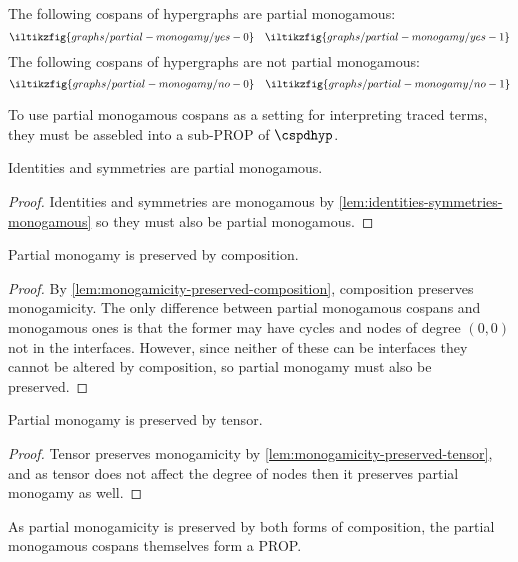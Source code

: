 \begin{example}\label{ex:partial-monogamous}
    The following cospans of hypergraphs are partial monogamous:
    \[
        \iltikzfig{graphs/partial-monogamy/yes-0}
        \quad
        \iltikzfig{graphs/partial-monogamy/yes-1}
    \]
    The following cospans of hypergraphs are not partial monogamous:
    \[
        \iltikzfig{graphs/partial-monogamy/no-0}
        \quad
        \iltikzfig{graphs/partial-monogamy/no-1}
    \]
\end{example}

To use partial monogamous cospans as a setting for interpreting traced terms,
they must be assebled into a sub-PROP of \(\cspdhyp\).

\begin{lemma}\label{lem:identities-symmetries-partial-monogamous}
    Identities and symmetries are partial monogamous.
\end{lemma}
\begin{proof}
    Identities and symmetries are monogamous by
    \cref{lem:identities-symmetries-monogamous} so they must also be partial
    monogamous.
\end{proof}

\begin{lemma}\label{lem:partial-monogamicity-preserved-composition}
    Partial monogamy is preserved by composition.
\end{lemma}
\begin{proof}
    By \cref{lem:monogamicity-preserved-composition}, composition preserves
    monogamicity.
    The only difference between partial monogamous cospans and monogamous ones
    is that the former may have cycles and nodes of degree \((0,0)\) not in the
    interfaces.
    However, since neither of these can be interfaces they cannot be altered by
    composition, so partial monogamy must also be preserved.
\end{proof}

\begin{lemma}\label{lem:partial-monogamicity-preserved-tensor}
    Partial monogamy is preserved by tensor.
\end{lemma}
\begin{proof}
    Tensor preserves monogamicity by
    \cref{lem:monogamicity-preserved-tensor}, and as tensor does not affect the
    degree of nodes then it preserves partial monogamy as well.
\end{proof}

As partial monogamicity is preserved by both forms of composition, the
partial monogamous cospans themselves form a PROP.

